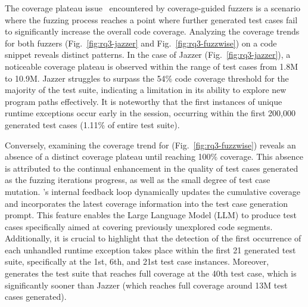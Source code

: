 The coverage plateau issue~\cite{lemieux2023codemosa} encountered by
coverage-guided fuzzers is a scenario where the fuzzing process
reaches a point where further generated test cases fail to
significantly increase the overall code coverage.
%
%
Analyzing the coverage trends for both fuzzers
(Fig.~\ref{fig:rq3-jazzer} and Fig.~\ref{fig:rq3-fuzzwise}) on a code
snippet reveals distinct patterns. In the case of Jazzer
(Fig.~\ref{fig:rq3-jazzer}), a noticeable coverage plateau is observed
within the range of test cases from 1.8M to 10.9M. Jazzer struggles to
surpass the 54\% code coverage threshold for the majority of the test
suite, indicating a limitation in its ability to explore new program
paths effectively. It is noteworthy that the first instances of unique
runtime exceptions occur early in the session, occurring within the
first 200,000 generated test cases (1.11\% of entire test suite).

Conversely, examining the coverage trend for {\tool}
(Fig.~\ref{fig:rq3-fuzzwise}) reveals an absence of a distinct coverage
plateau until reaching 100\% coverage. This absence is attributed to
the continual enhancement in the quality of test cases generated as
the fuzzing iterations progress, as well as the small degree of test case mutation. {\tool}'s internal feedback loop
dynamically updates the cumulative coverage and incorporates the
latest coverage information into the test case generation prompt. This
feature enables the Large Language Model (LLM) to produce test cases
specifically aimed at covering previously unexplored code segments.
Additionally, it is crucial to highlight that the detection of the
first occurrence of each unhandled runtime exception takes place
within the first 21 generated test suite, specifically at the 1st,
6th, and 21st test case instances. Moreover, {\tool} generates the test suite that reaches full coverage at the 40th test
case, which is significantly sooner than Jazzer (which reaches full coverage
around 13M test cases generated).


